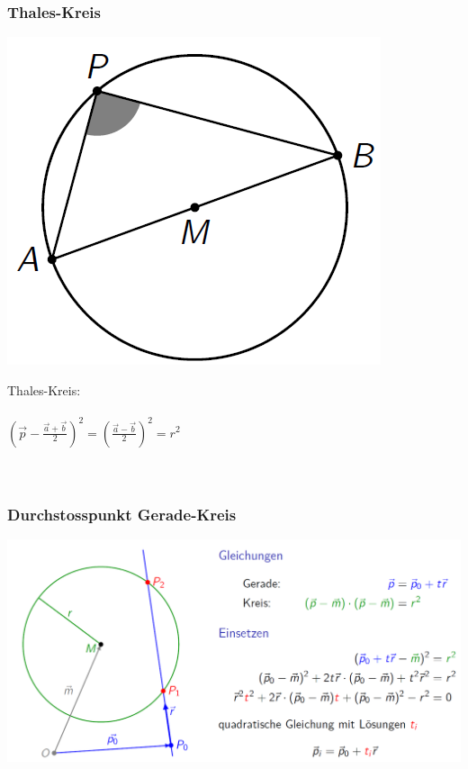 			\subsubsection{Thales-Kreis}
			\begin{minipage}[b]{.45\linewidth} 
  			\includegraphics[width=0.7\linewidth]{Bilder/thales-kreis}
			\end{minipage}
			\hfill
			\begin{minipage}[b]{.5\linewidth} 
  			Thales-Kreis: \\
  			\\
  			$\left( \vec{p} - \frac{\vec{a} + \vec{b}}{2} \right) ^2 = \left( \frac{\vec{a} - \vec{b}}{2} \right) ^2 = r^2$	\\
  			\\
  			\\
			\end{minipage}		
			
			\vfill\null
			\columnbreak			
			
			
			\subsubsection{Durchstosspunkt Gerade-Kreis}
				\includegraphics[width=0.8\linewidth]{Bilder/durchstosspunkt-gerade-kreis}	
			
